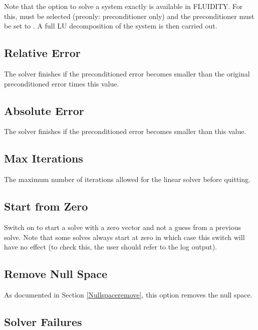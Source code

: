 Note that the option to solve a system exactly is available in FLUIDITY. For this,  must be selected (preonly: preconditioner only) and the preconditioner must be set to . A full LU decomposition of the system is then carried out.

\subsection{Relative Error}

The solver finishes if the preconditioned error becomes smaller than the original preconditioned error times this value. 

\subsection{Absolute Error}

The solver finishes if the preconditioned error becomes smaller than this value.

\subsection{Max Iterations}

The maximum number of iterations allowed for the linear solver before quitting.

\subsection{Start from Zero}

Switch on to start a solve with a zero vector and not a guess from a previous solve. Note that some solves always start at zero in which case this switch will have no effect (to check this, the user should refer to the log output). 

\subsection{Remove Null Space}

As documented in Section \ref{Nullspaceremove}, this option removes the null space.

\subsection{Solver Failures}


